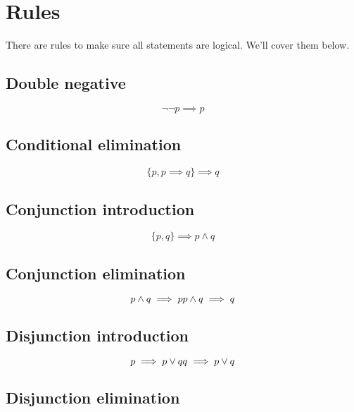 \documentclass[letterpaper,10pt]{article}
\begin{document}
\section{Rules}

There are rules to make sure all statements are logical. We'll cover them
below.

\subsection{Double negative}
\begin{equation*}
 \lnot\lnot p \implies p
\end{equation*}

\subsection{Conditional elimination}
\begin{equation*}
 \{p, p \implies q\} \implies q
\end{equation*}

\subsection{Conjunction introduction}

\begin{equation*}
 \{p, q\} \implies p \land q
\end{equation*}

\subsection{Conjunction elimination}

\begin{equation*}
 p \land q \implies p \\
 p \land q \implies q
\end{equation*}

\subsection{Disjunction introduction}

\begin{equation*}
 p \implies p \lor q \\
 q \implies p \lor q
\end{equation*}

\subsection{Disjunction elimination}
\end{document}

